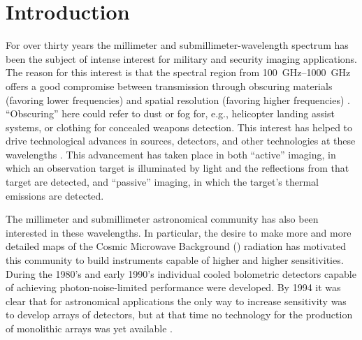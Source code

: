 \chapter{Introduction} \label{c:intro}



For over thirty years the millimeter and submillimeter-wavelength spectrum has been the subject of intense interest for military and security imaging applications.
The reason for this interest is that the spectral region from \SIrange{100}{1000}{\GHz} offers a good compromise between transmission through obscuring materials (favoring lower frequencies) and spatial resolution (favoring higher frequencies) \cite{kruse_why_1981}.
``Obscuring'' here could refer to dust or fog for, e.g., helicopter landing assist systems, or clothing for concealed weapons detection.
This interest has helped to drive technological advances in sources, detectors, and other technologies at these wavelengths \cite{popovic_thz_2011,rogalski_terahertz_2011,rieke_detection_2003}.
This advancement has taken place in both ``active'' imaging, in which an observation target is illuminated by light and the reflections from that target are detected, and ``passive'' imaging, in which the target's thermal emissions are detected.

The millimeter and submillimeter astronomical community has also been interested in these wavelengths.
In particular, the desire to make more and more detailed maps of the Cosmic Microwave Background (\CMB) radiation has motivated this community to build instruments capable of higher and higher sensitivities.
During the 1980's and early 1990's individual cooled bolometric detectors capable of achieving photon-noise-limited performance were developed.
By 1994 it was clear that for astronomical applications the only way to increase sensitivity was to develop arrays of detectors, but at that time no technology for the production of monolithic arrays was yet available \cite{richards_bolometers_1994}.

